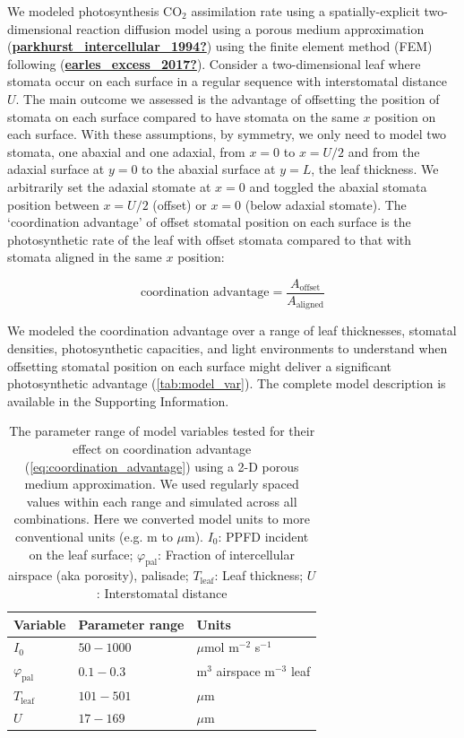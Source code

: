 \documentclass[12pt,halfline,a4paper,]{ouparticle}
\begin{document}
We modeled photosynthesis CO\(_2\) assimilation rate using a
spatially-explicit two-dimensional reaction diffusion model using a
porous medium approximation
(\protect\hyperlink{ref-parkhurst_intercellular_1994}{\textbf{parkhurst\_intercellular\_1994?}})
using the finite element method (FEM) following
(\protect\hyperlink{ref-earles_excess_2017}{\textbf{earles\_excess\_2017?}}).
Consider a two-dimensional leaf where stomata occur on each surface in a
regular sequence with interstomatal distance \(U\). The main outcome we
assessed is the advantage of offsetting the position of stomata on each
surface compared to have stomata on the same \(x\) position on each
surface. With these assumptions, by symmetry, we only need to model two
stomata, one abaxial and one adaxial, from \(x = 0\) to \(x = U/2\) and
from the adaxial surface at \(y = 0\) to the abaxial surface at
\(y = L\), the leaf thickness. We arbitrarily set the adaxial stomate at
\(x = 0\) and toggled the abaxial stomata position between \(x = U/2\)
(offset) or \(x = 0\) (below adaxial stomate). The `coordination
advantage' of offset stomatal position on each surface is the
photosynthetic rate of the leaf with offset stomata compared to that
with stomata aligned in the same \(x\) position:

\begin{equation} \label{eq:coordination_advantage}
  \text{coordination advantage} = \frac{A_\text{offset}}{A_\text{aligned}}
\end{equation}

We modeled the coordination advantage over a range of leaf thicknesses,
stomatal densities, photosynthetic capacities, and light environments to
understand when offsetting stomatal position on each surface might
deliver a significant photosynthetic advantage
(\autoref{tab:model_var}). The complete model description is available
in the Supporting Information.

\begin{table}

\caption{\label{tab:model_var}The parameter range of model variables tested for their effect on coordination advantage (\autoref{eq:coordination_advantage}) using a 2-D porous medium approximation. We used regularly spaced values within each range and simulated across all combinations. Here we converted model units to more conventional units (e.g. m to $\mu$m). $I_0$: PPFD incident on the leaf surface; $\varphi_\text{pal}$: Fraction of intercellular airspace (aka porosity), palisade; $T_\text{leaf}$: Leaf thickness; $U$: Interstomatal distance}
\centering
\begin{tabular}[t]{lll}
\toprule
Variable & Parameter range & Units\\
\midrule
$I_0$ & $50-1000$ & $\mu$mol m$^{-2}$ s$^{-1}$\\
$\varphi_\text{pal}$ & $0.1-0.3$ & m$^3$ airspace m$^{-3}$ leaf\\
$T_\text{leaf}$ & $101-501$ & $\mu$m\\
$U$ & $17-169$ & $\mu$m\\
\bottomrule
\end{tabular}
\end{table}
\end{document}
